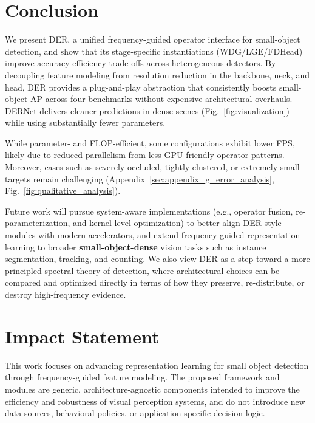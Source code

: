\documentclass{article}
\theoremstyle{plain}
\theoremstyle{definition}
\theoremstyle{remark}
\begin{document}
\section{Conclusion}

We present DER, a unified frequency-guided operator interface for small-object detection, and show that its stage-specific instantiations (WDG/LGE/FDHead) improve accuracy-efficiency trade-offs across heterogeneous detectors. By decoupling feature modeling from resolution reduction in the backbone, neck, and head, DER provides a plug-and-play abstraction that consistently boosts small-object AP across four benchmarks without expensive architectural overhauls. DERNet delivers cleaner predictions in dense scenes (Fig.~\ref{fig:visualization}) while using substantially fewer parameters.

While parameter- and FLOP-efficient, some configurations exhibit lower FPS, likely due to reduced parallelism from less GPU-friendly operator patterns. Moreover, cases such as severely occluded, tightly clustered, or extremely small targets remain challenging (Appendix~\ref{sec:appendix_g_error_analysis}, Fig.~\ref{fig:qualitative_analysis}).

Future work will pursue system-aware implementations (e.g., operator fusion, re-parameterization, and kernel-level optimization) to better align DER-style modules with modern accelerators, and extend frequency-guided representation learning to broader \textbf{small-object-dense} vision tasks such as instance segmentation, tracking, and counting. We also view DER as a step toward a more principled spectral theory of detection, where architectural choices can be compared and optimized directly in terms of how they preserve, re-distribute, or destroy high-frequency evidence.






\clearpage
\section*{Impact Statement}

This work focuses on advancing representation learning for small object detection through frequency-guided feature modeling. The proposed framework and modules are generic, architecture-agnostic components intended to improve the efficiency and robustness of visual perception systems, and do not introduce new data sources, behavioral policies, or application-specific decision logic.
\end{document}
